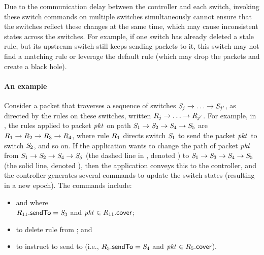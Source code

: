 Due to the communication delay between the controller and each switch,
invoking these switch commands on multiple switches simultaneously
cannot ensure that the switches reflect these changes at the same
time, which may cause inconsistent states across the switches. For
example, if one switch has already deleted a stale rule, but its
upstream switch still keeps sending packets to it, this switch may not
find a matching rule or leverage the default rule (which may drop the
packets and create a black hole).

\paragraph{An example}
Consider a packet \pktID{} that traverses a sequence of switches
$\switchID{\switchIdx} \rightarrow \ldots \rightarrow
\switchID{\switchIdxAlt}$, as directed by the rules on these switches,
written $\ruleID{\ruleIdx} \rightarrow \ldots \rightarrow
\ruleID{\ruleIdxAlt}$. For example, in , the rules
applied to packet $\pktID{}$ on path $\switchID{1} \rightarrow
\switchID{2} \rightarrow \switchID{4} \rightarrow \switchID{5}$ are
$\ruleID{1} \rightarrow \ruleID{2} \rightarrow \ruleID{3} \rightarrow
\ruleID{4}$, where rule $\ruleID{1}$ directs switch $\switchID{1}$ to
send the packet $\pktID{}$ to switch $\switchID{2}$, and so on. If the
application wants to change the path of packet $\pktID{}$ from
$\switchID{1} \rightarrow \switchID{2} \rightarrow \switchID{4}
\rightarrow \switchID{5}$ (the dashed line in ,
denoted \oldPath{\pktID{}}) to $\switchID{1} \rightarrow \switchID{3}
\rightarrow \switchID{4} \rightarrow \switchID{5}$ (the solid line,
denoted \newPath{\pktID{}}), then the application conveys this to the
controller, and the controller generates several commands to update
the switch states (resulting in a new epoch). The commands include:
\begin{itemize}
\item {} and
  where\\ $\ruleID{11}{\sendToField} = \switchID{3}$ and $\pktID{}
  \in \ruleID{11}{\coverField}$;

\item {} to delete rule 
  from ; and

\item {} to instruct  to
  send \pktID{} to  (i.e., $\ruleID{5}{\sendToField} =
  \switchID{4}$ and $\pktID{} \in \ruleID{5}{\coverField}$).
\end{itemize}

